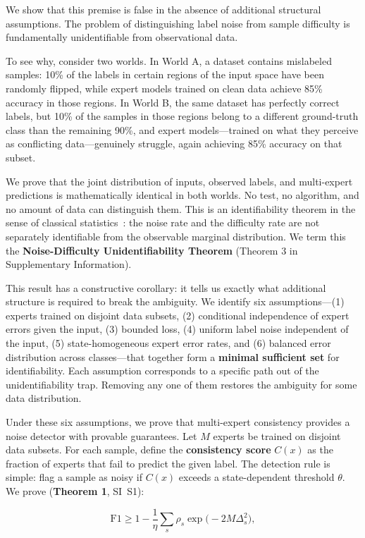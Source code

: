 We show that this premise is false in the absence of additional structural assumptions. The problem of distinguishing label noise from sample difficulty is fundamentally unidentifiable from observational data.

To see why, consider two worlds. In World A, a dataset contains mislabeled samples: 10\% of the labels in certain regions of the input space have been randomly flipped, while expert models trained on clean data achieve 85\% accuracy in those regions. In World B, the same dataset has perfectly correct labels, but 10\% of the samples in those regions belong to a different ground-truth class than the remaining 90\%, and expert models---trained on what they perceive as conflicting data---genuinely struggle, again achieving 85\% accuracy on that subset.

We prove that the joint distribution of inputs, observed labels, and multi-expert predictions is mathematically identical in both worlds. No test, no algorithm, and no amount of data can distinguish them. This is an identifiability theorem in the sense of classical statistics~\cite{...}: the noise rate and the difficulty rate are not separately identifiable from the observable marginal distribution. We term this the \textbf{Noise-Difficulty Unidentifiability Theorem} (Theorem 3 in Supplementary Information).

This result has a constructive corollary: it tells us exactly what additional structure is required to break the ambiguity. We identify six assumptions---(1) experts trained on disjoint data subsets, (2) conditional independence of expert errors given the input, (3) bounded loss, (4) uniform label noise independent of the input, (5) state-homogeneous expert error rates, and (6) balanced error distribution across classes---that together form a \textbf{minimal sufficient set} for identifiability. Each assumption corresponds to a specific path out of the unidentifiability trap. Removing any one of them restores the ambiguity for some data distribution.

Under these six assumptions, we prove that multi-expert consistency provides a noise detector with provable guarantees. Let $M$ experts be trained on disjoint data subsets. For each sample, define the \textbf{consistency score} $C(x)$ as the fraction of experts that fail to predict the given label. The detection rule is simple: flag a sample as noisy if $C(x)$ exceeds a state-dependent threshold $\theta$. We prove (\textbf{Theorem 1}, SI~S1):

\begin{equation}
\mathrm{F1} \geq 1 - \frac{1}{\eta}\sum_{s} \rho_s \exp\bigl(-2M\Delta_s^2\bigr),
\end{equation}


